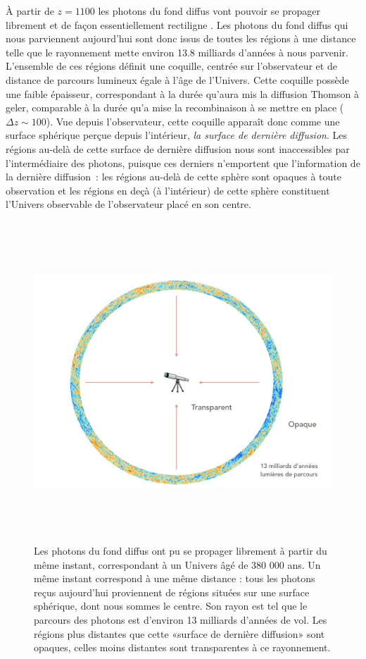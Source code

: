 À partir de $z=1100$ les photons du fond diffus vont pouvoir se propager librement et de façon essentiellement rectiligne . Les photons du fond diffus qui nous parviennent aujourd'hui sont donc issus de toutes les régions à une distance telle que le rayonnement mette environ 13.8 milliards d'années à nous parvenir. L'ensemble de ces régions définit une coquille, centrée sur l'observateur et de distance de parcours lumineux égale à l'âge de l'Univers. Cette coquille possède une faible épaisseur, correspondant à la durée qu'aura mis la diffusion Thomson à geler, comparable à la durée qu'a mise la recombinaison à se mettre en place ($\Delta z\sim 100$). Vue depuis l'observateur, cette coquille apparaît donc comme une surface sphérique perçue depuis l'intérieur, \textit{la surface de dernière diffusion}. Les régions au-delà de cette surface de dernière diffusion nous sont inaccessibles par l'intermédiaire des photons, puisque ces derniers n'emportent que l'information de la dernière diffusion~: les régions au-delà de cette sphère sont opaques à toute observation et les régions en deçà (à l'intérieur) de cette sphère constituent l'Univers observable de l'observateur placé en son centre.

\begin{figure}[htbp]
	\centering
		\includegraphics[height=12cm]{figs/LSS.png}
	\caption[L'Univers devient transparent au CMB]{Les photons du fond diffus ont pu se propager librement à partir du même instant, correspondant à un Univers âgé de 380 000 ans. Un même instant correspond à une même distance : tous les photons reçus aujourd'hui proviennent de régions situées sur une surface sphérique, dont nous sommes le centre. Son rayon est tel que le parcours des photons est d'environ 13 milliards d'années de vol. Les régions plus distantes que cette «surface de dernière diffusion» sont opaques, celles moins distantes sont transparentes à ce rayonnement.}
	\label{f:LSS}
\end{figure}

